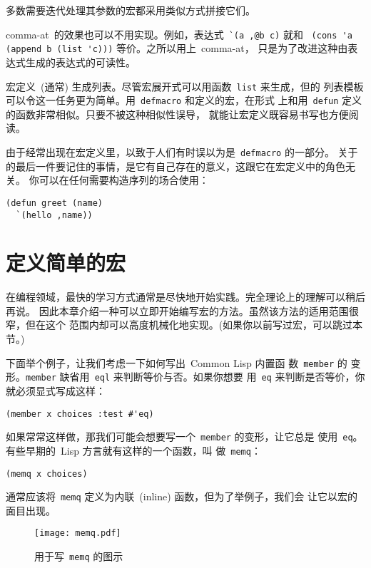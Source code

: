 多数需要迭代处理其参数的宏都采用类似方式拼接它们。

comma-at~的效果也可以不用\bq{}实现。例如，表达式~\verb|`(a ,@b c)| 就和
~\verb|(cons 'a (append b (list 'c)))| 等价。之所以用上~comma-at，
只是为了改进这种由表达式生成的表达式的可读性。

宏定义~(通常) 生成列表。尽管宏展开式可以用函数~\verb|list| 来生成，但\bq{}的
列表模板可以令这一任务更为简单。用~\verb|defmacro| 和\bq{}定义的宏，在形式
上和用~\verb|defun| 定义的函数非常相似。只要不被这种相似性误导，\bq{}
就能让宏定义既容易书写也方便阅读。

由于\bq{}经常出现在宏定义里，以致于人们有时误以为\bq{}是~\verb|defmacro| 的一部分。
关于\bq{}的最后一件要记住的事情，是它有自己存在的意义，这跟它在宏定义中的角色无关。
你可以在任何需要构造序列的场合使用\bq{}：
\begin{lstlisting}
(defun greet (name)
  `(hello ,name))
\end{lstlisting}

\section{定义简单的宏}
\label{sec:defining_simple_macros}

在编程领域，最快的学习方式通常是尽快地开始实践。完全理论上的理解可以稍后再说。
因此本章介绍一种可以立即开始编写宏的方法。虽然该方法的适用范围很窄，但在这个
范围内却可以高度机械化地实现。(如果你以前写过宏，可以跳过本节。)

下面举个例子，让我们考虑一下如何写出~Common Lisp 内置函
数~\verb|member| 的
变形。\verb|member| 缺省用~\verb|eql| 来判断等价与否。如果你想要
用~\verb|eq| 来判断是否等价，你就必须显式写成这样：
\begin{lstlisting}
(member x choices :test #'eq)
\end{lstlisting}

如果常常这样做，那我们可能会想要写一个~\verb|member| 的变形，让它总是
使用~\verb|eq|。有些早期的~Lisp 方言就有这样的一个函数，叫
做~\verb|memq|：
\begin{lstlisting}
(memq x choices)
\end{lstlisting}
通常应该将~\texttt{memq} 定义为内联~(inline) 函数，但为了举例子，我们会
让它以宏的面目出现。

\begin{figure}
  \texttt{[image: memq.pdf]}
  \caption{\label{fig:diagram_used_in_writing_memq}用于写~\texttt{memq} 的图示}
\end{figure}

